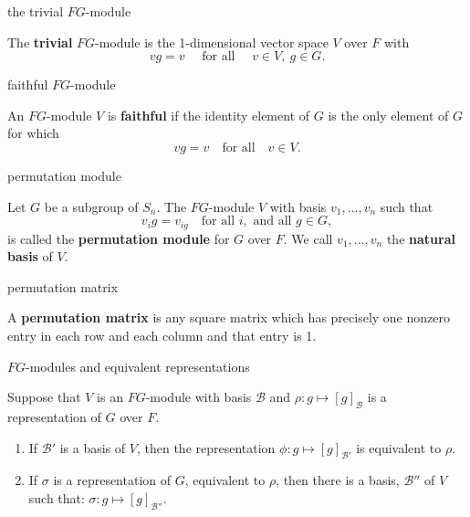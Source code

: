 \documentclass[avery5371,grid]{flashcards}
\newcommand{\B}{\mathscr{B}}
\newcommand{\defn}[1]{\textbf{#1}}
\begin{document}
\begin{flashcard}[Definition 4.8 (1)]{the trivial $FG$-module}

  The \defn{trivial} $FG$-module is the 1-dimensional vector space $V$
  over $F$ with
  \[
    vg = v \quad \text{ for all } \quad v\in V, \: g\in G.
  \]

\end{flashcard}

\begin{flashcard}[Definition 4.8 (2)]{faithful $FG$-module}

  An $FG$-module $V$ is \defn{faithful} if the identity element of $G$
  is the only element of $G$ for which
  \[
    vg = v \quad \text{for all} \quad v\in V.
  \]

\end{flashcard}

\begin{flashcard}[Definition 4.10]{permutation module}

  Let $G$ be a subgroup of $S_n$. The $FG$-module $V$ with basis
  $v_1, \ldots, v_n$ such that
  \[
    v_i g = v_{ig} \quad \text{for all } i, \text{ and all } g\in G,
  \]
  is called the \defn{permutation module} for $G$ over $F$. We call
  $v_1, \ldots, v_n$ the \defn{natural basis} of $V$.

\end{flashcard}


\begin{flashcard}[Definition]{permutation matrix}

  A \defn{permutation matrix} is any square matrix which has precisely
  one nonzero entry in each row and each column and that entry is 1.

\end{flashcard}

\begin{flashcard}[Theorem 4.12]{$FG$-modules and equivalent representations}

  Suppose that $V$ is an $FG$-module with basis $\B$ and
  $\rho : g \mapsto [g]_{\B}$ is a representation of $G$ over $F$.
  \begin{enumerate}
  \item If $\B'$ is a basis of $V$, then the representation
    $\phi : g \mapsto [g]_{\B'}$ is equivalent to $\rho$.
  \item If $\sigma$ is a representation of $G$, equivalent to $\rho$,
    then there is a basis, $\B''$ of $V$ such that:
    $\sigma : g \mapsto [g]_{\B''}$.
  \end{enumerate}

\end{flashcard}
\end{document}
